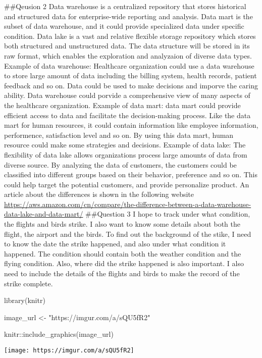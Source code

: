\documentclass[
]{article}
\newenvironment{Shaded}{\begin{snugshade}}{\end{snugshade}}
\newcommand{\FunctionTok}[1]{\textcolor[rgb]{0.00,0.00,0.00}{#1}}
\newcommand{\NormalTok}[1]{#1}
\newcommand{\OtherTok}[1]{\textcolor[rgb]{0.56,0.35,0.01}{#1}}
\newcommand{\SpecialCharTok}[1]{\textcolor[rgb]{0.00,0.00,0.00}{#1}}
\newcommand{\StringTok}[1]{\textcolor[rgb]{0.31,0.60,0.02}{#1}}
\begin{document}
\#\#Qeusion 2 Data warehouse is a centralized repository that stores
historical and structured data for enterprise-wide reporting and
analysis. Data mart is the subset of data warehouse, and it could
provide specialized data under specific condition. Data lake is a vast
and relative flexible storage repository which stores both structured
and unstructured data. The data structure will be stored in its raw
format, which enables the exploration and analyzaion of diverse data
types. Example of data warehouse: Healthcare organization could use a
data warehouse to store large amount of data including the billing
system, health records, patient feedback and so on. Data could be used
to make decisions and imporve the caring ability. Data warehouse could
porvide a comprehensive view of many aspects of the healthcare
organization. Example of data mart: data mart could provide efficient
access to data and facilitate the decision-making process. Like the data
mart for human resources, it could contain information like employee
information, performence, satisfaction level and so on. By using this
data mart, human resource could make some strategies and decisions.
Example of data lake: The flexibility of data lake allows organizations
process large amounts of data from diverse source. By analyzing the data
of customers, the customers could be classified into different groups
based on their behavior, preference and so on. This could help target
the potential customers, and provide personalize product. An article
about the differences is shown in the following website
\url{https://aws.amazon.com/cn/compare/the-difference-between-a-data-warehouse-data-lake-and-data-mart/}
\#\#Question 3 I hope to track under what condition, the flights and
birds strike. I also want to know some details about both the flight,
the airport and the birds. To find out the background of the stike, I
need to know the date the strike happened, and also under what condition
it happened. The condition should contain both the weather condition and
the flying condition. Also, where did the strike happened is also
important. I also need to include the details of the flights and birds
to make the record of the strike complete.

\begin{Shaded}
\begin{Highlighting}[]
\FunctionTok{library}\NormalTok{(knitr)}

\NormalTok{image\_url }\OtherTok{\textless{}{-}} \StringTok{"https://imgur.com/a/sQU5fR2"}

\NormalTok{knitr}\SpecialCharTok{::}\FunctionTok{include\_graphics}\NormalTok{(image\_url)}
\end{Highlighting}
\end{Shaded}

\texttt{[image: https://imgur.com/a/sQU5fR2]}
\end{document}
